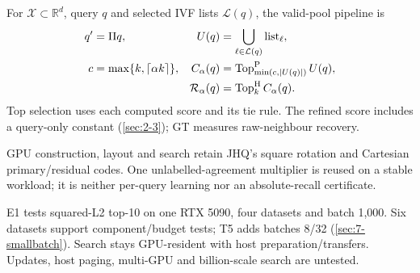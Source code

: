 For $\mathcal X\subset\mathbb R^d$, query $q$ and selected IVF lists $\mathcal L(q)$, the valid-pool pipeline is
\[
 \begin{aligned}
 q'&=\Pi q,&
 U(q)&=\bigcup_{\ell\in\mathcal L(q)}\mathrm{list}_\ell,\\
 c&=\max\{k,\lceil\alpha k\rceil\},&
 C_\alpha(q)&=\operatorname{Top}^{\rm P}_{\min(c,|U(q)|)}U(q),\\
 &&\mathcal R_\alpha(q)&=\operatorname{Top}^{\rm H}_k C_\alpha(q).
 \end{aligned}
\]
Top selection uses each computed score and its tie rule. The refined score includes a query-only constant (\cref{sec:2-3}); GT measures raw-neighbour recovery.

GPU construction, layout and search retain JHQ's square rotation and Cartesian primary/residual codes. One unlabelled-agreement multiplier is reused on a stable workload; it is neither per-query learning nor an absolute-recall certificate.

E1 tests squared-L2 top-10 on one RTX 5090, four datasets and batch 1,000. Six datasets support component/budget tests; T5 adds batches 8/32 (\cref{sec:7-smallbatch}). Search stays GPU-resident with host preparation/transfers. Updates, host paging, multi-GPU and billion-scale search are untested.